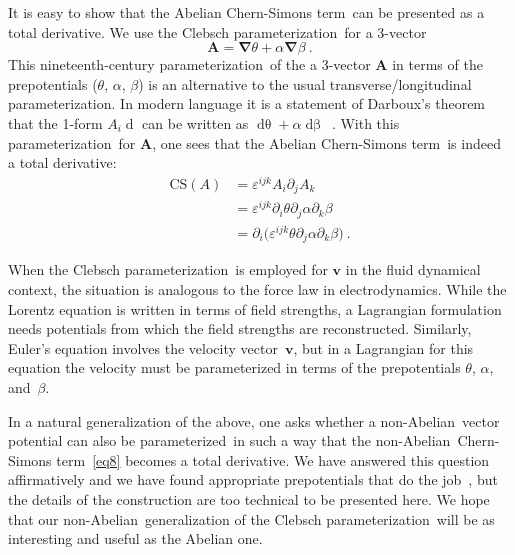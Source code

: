 \documentclass[a4paper,12pt,twoside]{article}
\newcommand{\rd}[1]{\mathop{\mathrm{d}#1}}
\newcommand{\grad}{\vec\nabla}
\newcommand{\nA}{non-Abelian}
\newcommand{\CSt}{Chern-Simons term}
\newcommand{\Cpr}{Clebsch pa\-ra\-me\-ter\-iza\-tion}
\newcommand{\pr}{para\-me\-ter\-iza\-tion}
\newcommand{\prd}{para\-me\-ter\-ized}
\newcommand{\pp}[1]{\partial_{#1}}
\newcommand{\numeq}[2]{\begin{equation}
#2
\label{#1}
\end{equation}}
\let\vec\boldsymbol
\let\eps\varepsilon
\begin{document}
It is easy to show that the  Abelian \CSt\ can be presented as a total derivative. We
use the \Cpr\ for  a 3-vector~\cite{ref11}
\numeq{eq10}{
\vec A = \grad\theta + \alpha\grad\beta\ .
}
This nineteenth-century \pr\ of the a 3-vector $\vec A$ in terms of the prepotentials
($\theta$, $\alpha$, $\beta$) is an alternative to the usual transverse/longitudinal
\pr. In modern language it is a statement of Darboux's
theorem that the 1-form $A_i \rd{r^i}$ can be written as $\rd \theta + \alpha
\rd\beta$~\cite{ref12}. With this
\pr\ for $\vec A$, one sees that the Abelian \CSt\ is indeed a total derivative:
\begin{align}
\mathrm{CS}(A) &= \eps^{ijk} A_i \pp j A_k\label{eq11}\\
&=  \eps^{ijk} \pp i \theta\pp j \alpha \pp k \beta\nonumber\\
&= \pp i \bigl( \eps^{ijk} \theta\pp j \alpha \pp k \beta\bigr)\ .\nonumber
\end{align}

When the \Cpr\ is employed for $\vec v$ in the fluid dynamical context, the
situation is analogous to the force law in electrodynamics. While the Lorentz equation
is written in terms of field strengths, a Lagrangian formulation needs potentials from
which the field strengths are reconstructed. Similarly, Euler's equation involves the
velocity vector~$\vec v$, but in a Lagrangian for this equation the velocity must be
parameterized in terms of the  prepotentials $\theta$, $\alpha$, and~$\beta$. 

In a natural generalization of the above, one asks whether a \nA\ vector potential
can also be \prd\ in such a way that the \nA\ \CSt~\eqref{eq8} becomes a total
derivative. We have answered this question affirmatively and we have found
appropriate prepotentials that do the job~\cite{ref10,ref13,ref14}, but the details of
the construction are too technical to be presented here. We hope that our \nA\
generalization of the \Cpr\ will be as interesting and useful as the Abelian one.
\vspace*{-\bigskipamount}
\end{document}
